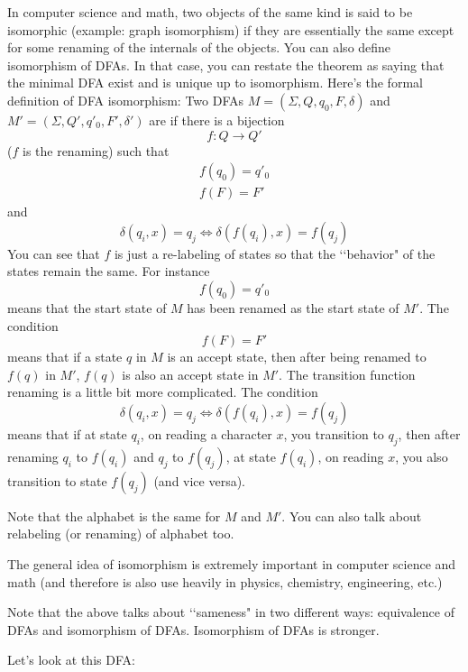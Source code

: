 In computer science and math, two objects of the same kind
is said to be isomorphic (example: graph isomorphism)
if they are essentially the same except for some renaming
of the internals of the objects.
You can also define isomorphism of DFAs.
In that case, you can restate the theorem as saying that the
minimal DFA exist and is unique up to isomorphism.
Here's the formal definition of DFA isomorphism:
Two DFAs
$M = (\Sigma, Q, q_0, F, \delta)$
and
$M' = (\Sigma, Q', q'_0, F', \delta')$
are  if there is a bijection
\[
f: Q \rightarrow Q'
\]
($f$ is the renaming)
such that
\begin{align*}
f(q_0) = q'_0 \\
f(F) = F' 
\end{align*}
and
\[
\delta(q_i, x) = q_j
\iff
\delta(f(q_i), x) = f(q_j)
\]
You can see that $f$ is just a re-labeling of states
so that the \lq\lq behavior" of the states remain the same.
For instance
\[
f(q_0) = q'_0
\]
means that the start state of $M$ has been renamed as the start state
of $M'$.
The condition
\[
f(F) = F'
\]
means that if a state $q$ in $M$ is an accept state,
then after being renamed to $f(q)$ in $M'$, $f(q)$ is also an accept
state in $M'$.
The transition function renaming is a little bit more complicated.
The condition
\[
\delta(q_i, x) = q_j
\iff
\delta(f(q_i), x) = f(q_j)
\]
means that if at state $q_i$, on reading a character $x$,
you transition to $q_j$, then after renaming
$q_i$ to $f(q_i)$
and
$q_j$ to $f(q_j)$,
at state $f(q_i)$, on reading $x$, you also transition to
state $f(q_j)$ (and vice versa).

Note that the alphabet is the same for $M$ and $M'$.
You can also talk about relabeling (or renaming) of alphabet too.

The general idea of isomorphism is extremely important in
computer science and math (and therefore is also use heavily in
physics, chemistry, engineering, etc.)

Note that the above talks about \lq\lq sameness" in two different
ways: equivalence of DFAs and isomorphism of DFAs.
Isomorphism of DFAs is stronger.


\newpage



\newpage


\newpage



\newpage

Let's look at this DFA:

